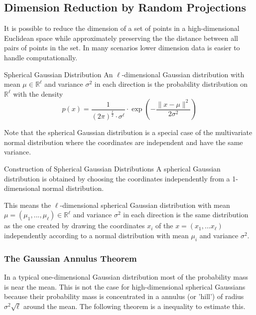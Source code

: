 \documentclass{panikzettel}
\begin{document}

\subsection{Dimension Reduction by Random Projections}
It is possible to reduce the dimension of a set of points in a high-dimensional Euclidean space while approximately preserving the the distance between all pairs of points in the set. In many scenarios lower dimension data is easier to handle computationally.

\begin{halfboxl}
\vspace{-\baselineskip}
\begin{defi}{Spherical Gaussian Distribution}
An $\ell$-dimensional Gaussian distribution with mean $\mu \in \mathbb{R}^\ell$ and variance $\sigma^2$ in each direction is the probability distribution on $\mathbb{R}^\ell$ with the density
\[
p(x)=\frac{1}{(2 \pi)^\frac{\ell}{2}\cdot \sigma^\ell}\cdot \exp \left(-\frac{\parallel x-\mu \parallel^2}{2\sigma^2} \right)
\]
\end{defi}
\end{halfboxl}
\begin{halfboxr}
\vspace{-\baselineskip}
Note that the spherical Gaussian distribution is a special case of the multivariate normal distribution where the coordinates are independent and have the same variance.
\end{halfboxr}
\begin{theo}{Construction of Spherical Gaussian Distributions}
A spherical Gaussian distribution is obtained by choosing the coordinates independently from a 1-dimensional normal distribution.

This means the $\ell$-dimensional spherical Gaussian distribution with mean $\mu=(\mu_1,...,\mu_\ell)\in\mathbb{R}^\ell$ and variance $\sigma^2$ in each direction is the same distribution as the one created by drawing the coordinates $x_i$ of the $x=(x_1,...x_\ell)$ independently according to a normal distribution with mean $\mu_i$ and variance $\sigma^2$.
\end{theo}

\subsubsection{The Gaussian Annulus Theorem}
In a typical one-dimensional Gaussian distribution most of the probability mass is near the mean. This is not the case for high-dimensional spherical Gaussians because their probability mass is concentrated in a annulus (or 'hill') of radius $\sigma^2 \sqrt{\ell}$ around the mean. The following theorem is a inequality to estimate this.
\end{document}
